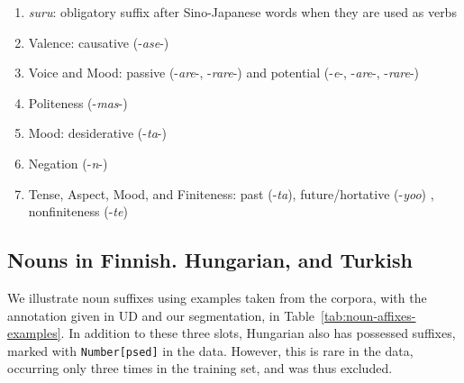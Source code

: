 \documentclass[11pt,letterpaper]{article}
\begin{document}
\begin{enumerate}
\item \textit{suru}: obligatory suffix after Sino-Japanese words when they are used as verbs
\item Valence: causative (-\textit{ase}-)
\item Voice and Mood: passive (-\textit{are}-, -\textit{rare}-) and potential (-\textit{e}-, -\textit{are}-, -\textit{rare}-)
\item Politeness (-\textit{mas}-)
\item Mood: desiderative (-\textit{ta}-)
\item Negation (-\textit{n}-)
\item Tense, Aspect, Mood, and Finiteness: past (-\textit{ta}), future/hortative (-\textit{yoo}) \citep[229]{kaiser2013japanese}, nonfiniteness (-\textit{te})
\end{enumerate}


\subsection{Nouns in Finnish. Hungarian, and Turkish}

We illustrate noun suffixes using examples taken from the corpora, with the annotation given in UD and our segmentation, in Table~\ref{tab:noun-affixes-examples}.
In addition to these three slots, Hungarian also has possessed suffixes, marked with \texttt{Number[psed]} in the data.
However, this is rare in the data, occurring only three times in the training set, and was thus excluded.
\end{document}
